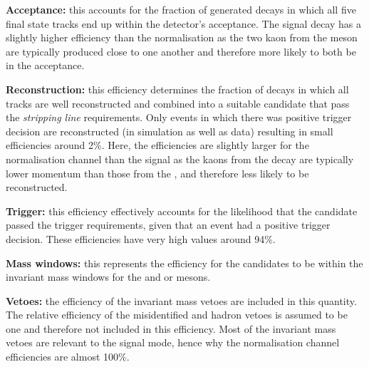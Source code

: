 \begin{description}

\item \textbf{Acceptance:} this accounts for the fraction of generated decays in which all five final state tracks end up within the \lhcb detector's acceptance. The signal decay has a slightly higher efficiency than the normalisation as the two kaon from the \phiz meson are typically produced close to one another and therefore more likely to both be in the acceptance.   

\item \textbf{Reconstruction:} this efficiency determines the fraction of decays in which all tracks are well reconstructed and combined into a suitable candidate that pass the \emph{stripping line} requirements. 
Only events in which there was positive trigger decision are reconstructed (in simulation as well as data) resulting in small efficiencies around 2\%.
Here, the efficiencies are slightly larger for the normalisation channel than the signal as the kaons from the \phiz decay are typically lower momentum than those from the \Dzb, and therefore less likely to be reconstructed.  

\item \textbf{Trigger:} this efficiency effectively accounts for the likelihood that the candidate passed the trigger requirements, given that an event had a positive trigger decision. These efficiencies have very high values around 94\%.  

\item \textbf{Mass windows:} this represents the efficiency for the candidates to be within the invariant mass windows for the \Dsp and \phiz or \Dzb mesons. 

\item \textbf{Vetoes:} the efficiency of the invariant mass vetoes are included in this quantity. The relative efficiency of the misidentified \D and \Lc hadron vetoes is assumed to be one and therefore not included in this efficiency. 
Most of the invariant mass vetoes are relevant to the signal mode, hence why the normalisation channel efficiencies are almost 100\%.


\end{description}
